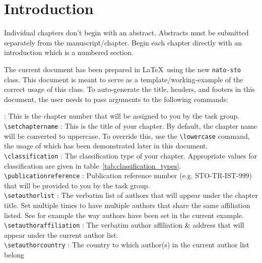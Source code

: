 \documentclass{nato-sto}
\begin{document}
\maketitle


\section{Introduction}

Individual chapters don't begin with an abstract. Abstracts must be submitted separately from the manuscript/chapter. Begin each chapter directly with an introduction which is a numbered section. 

\noindent The current document has been prepared in \LaTeX ~using the new \verb|nato-sto| class. This document is meant to serve as a template/working-example of the correct usage of this class. To auto-generate the title, headers, and footers in this document, the user needs to pass arguments to the following commands:

\noindent {\verb|\setchapternumber|} : This is the chapter number that will be assigned to you by the task group.\\
{\verb|\setchaptername|} : This is the title of your chapter. By default, the chapter name will be converted to uppercase. To override this, use the \verb|\lowercase| command, the usage of which has been demonstrated later in this document.\\
{\verb|\classification|} : The classification type of your chapter. Appropriate values for classification are given in table~\ref{tab:classification_types}.\\
{\verb|\publicationreference|} : Publication reference number (e.g. STO-TR-IST-999) that will be provided to you by the task group.\\
{\verb|\setauthorlist|} : The verbatim list of authors that will appear under the chapter title. Set multiple times to have multiple authors that share the same affiliation listed. See for example the way authors have been set in the current example.\\
{\verb|\setauthoraffiliation|} : The verbatim author affiliation \& address that will appear under the current author list. \\
{\verb|\setauthorcountry|} : The country to which author(s) in the current author list belong

\end{document}
